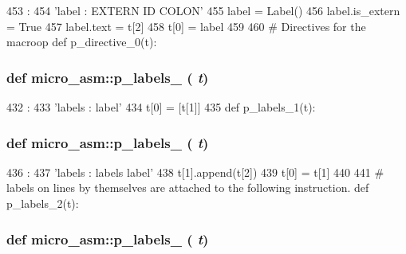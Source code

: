 \begin{DoxyCode}
453                 :
454     'label : EXTERN ID COLON'
455     label = Label()
456     label.is_extern = True
457     label.text = t[2]
458     t[0] = label
459 
460 # Directives for the macroop
def p_directive_0(t):
\end{DoxyCode}
\hypertarget{namespacemicro__asm_a9cb8e2ba66d91a1d4dfb7cb3a90c1cf7}{
\subsubsection[{p\_\-labels\_\-0}]{\setlength{\rightskip}{0pt plus 5cm}def micro\_\-asm::p\_\-labels\_ ( {\em t})}}
\label{namespacemicro__asm_a9cb8e2ba66d91a1d4dfb7cb3a90c1cf7}



\begin{DoxyCode}
432                  :
433     'labels : label'
434     t[0] = [t[1]]
435 
def p_labels_1(t):
\end{DoxyCode}
\hypertarget{namespacemicro__asm_a14c2988a6cdde6544b11178ffa1ac4e1}{
\subsubsection[{p\_\-labels\_\-1}]{\setlength{\rightskip}{0pt plus 5cm}def micro\_\-asm::p\_\-labels\_ ( {\em t})}}
\label{namespacemicro__asm_a14c2988a6cdde6544b11178ffa1ac4e1}



\begin{DoxyCode}
436                  :
437     'labels : labels label'
438     t[1].append(t[2])
439     t[0] = t[1]
440 
441 # labels on lines by themselves are attached to the following instruction.
def p_labels_2(t):
\end{DoxyCode}
\hypertarget{namespacemicro__asm_a16e86f7b82ae8abcb138c274ff0743b8}{
\subsubsection[{p\_\-labels\_\-2}]{\setlength{\rightskip}{0pt plus 5cm}def micro\_\-asm::p\_\-labels\_ ( {\em t})}}
\label{namespacemicro__asm_a16e86f7b82ae8abcb138c274ff0743b8}



